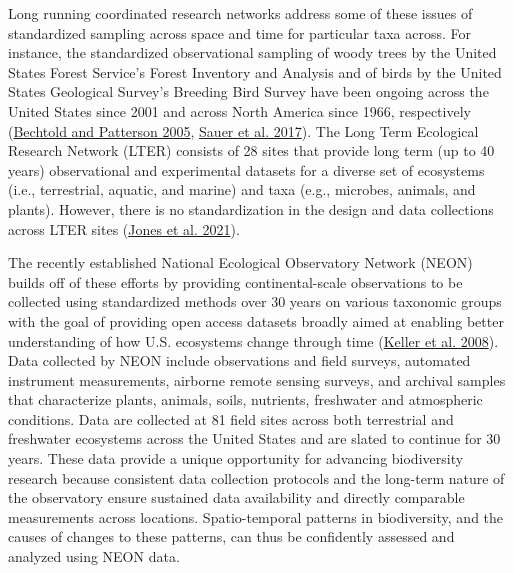 \documentclass[
  12pt,
]{article}
\begin{document}
Long running coordinated research networks address some of these issues of standardized sampling across space and time for particular taxa across. For instance, the standardized observational sampling of woody trees by the United States Forest Service's Forest Inventory and Analysis and of birds by the United States Geological Survey's Breeding Bird Survey have been ongoing across the United States since 2001 and across North America since 1966, respectively (\protect\hyperlink{ref-bechtold2005enhanced}{Bechtold and Patterson 2005}, \protect\hyperlink{ref-sauer2017first}{Sauer et al. 2017}). The Long Term Ecological Research Network (LTER) consists of 28 sites that provide long term (up to 40 years) observational and experimental datasets for a diverse set of ecosystems (i.e., terrestrial, aquatic, and marine) and taxa (e.g., microbes, animals, and plants). However, there is no standardization in the design and data collections across LTER sites (\protect\hyperlink{ref-jones2021synergies}{Jones et al. 2021}).

The recently established National Ecological Observatory Network (NEON) builds off of these efforts by providing continental-scale observations to be collected using standardized methods over 30 years on various taxonomic groups with the goal of providing open access datasets broadly aimed at enabling better understanding of how U.S. ecosystems change through time (\protect\hyperlink{ref-keller2008continental}{Keller et al. 2008}). Data collected by NEON include observations and field surveys, automated instrument measurements, airborne remote sensing surveys, and archival samples that characterize plants, animals, soils, nutrients, freshwater and atmospheric conditions. Data are collected at 81 field sites across both terrestrial and freshwater ecosystems across the United States and are slated to continue for 30 years. These data provide a unique opportunity for advancing biodiversity research because consistent data collection protocols and the long-term nature of the observatory ensure sustained data availability and directly comparable measurements across locations. Spatio-temporal patterns in biodiversity, and the causes of changes to these patterns, can thus be confidently assessed and analyzed using NEON data.
\end{document}
